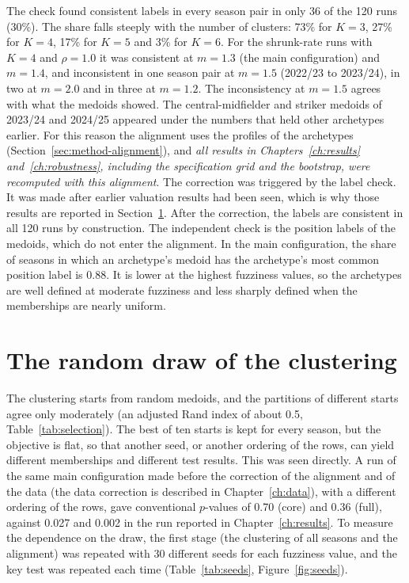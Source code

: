 The check found consistent labels in every season pair in only 36 of the 120 runs (30\%). The share falls steeply with the number of clusters: 73\% for $K=3$, 27\% for $K=4$, 17\% for $K=5$ and 3\% for $K=6$. For the shrunk-rate runs with $K=4$ and $\rho=1.0$ it was consistent at $m=1.3$ (the main configuration) and $m=1.4$, and inconsistent in one season pair at $m=1.5$ (2022/23 to 2023/24), in two at $m=2.0$ and in three at $m=1.2$. The inconsistency at $m=1.5$ agrees with what the medoids showed. The central-midfielder and striker medoids of 2023/24 and 2024/25 appeared under the numbers that held other archetypes earlier. For this reason the alignment uses the profiles of the archetypes (Section~\ref{sec:method-alignment}), and \emph{all results in Chapters~\ref{ch:results} and~\ref{ch:robustness}, including the specification grid and the bootstrap, were recomputed with this alignment}. The correction was triggered by the label check. It was made after earlier valuation results had been seen, which is why those results are reported in Section~\ref{sec:rob-seeds}. After the correction, the labels are consistent in all 120 runs by construction. The independent check is the position labels of the medoids, which do not enter the alignment. In the main configuration, the share of seasons in which an archetype's medoid has the archetype's most common position label is 0.88. It is lower at the highest fuzziness values, so the archetypes are well defined at moderate fuzziness and less sharply defined when the memberships are nearly uniform.

\section{The random draw of the clustering}
\label{sec:rob-seeds}

The clustering starts from random medoids, and the partitions of different starts agree only moderately (an adjusted Rand index of about 0.5, Table~\ref{tab:selection}). The best of ten starts is kept for every season, but the objective is flat, so that another seed, or another ordering of the rows, can yield different memberships and different test results. This was seen directly. A run of the same main configuration made before the correction of the alignment and of the data (the data correction is described in Chapter~\ref{ch:data}), with a different ordering of the rows, gave conventional $p$-values of 0.70 (core) and 0.36 (full), against 0.027 and 0.002 in the run reported in Chapter~\ref{ch:results}. To measure the dependence on the draw, the first stage (the clustering of all seasons and the alignment) was repeated with 30 different seeds for each fuzziness value, and the key test was repeated each time (Table~\ref{tab:seeds}, Figure~\ref{fig:seeds}).

